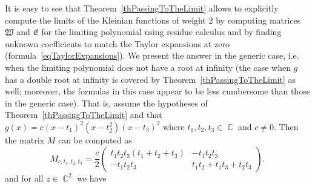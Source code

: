 \documentclass{amsart}
\numberwithin{equation}{section}
\theoremstyle{definition}
\theoremstyle{remark}
\DeclareMathOperator{\CC}{\mathbb C}
\begin{document}
	It is easy to see that Theorem~\ref{thPassingToTheLimit} allows to explicitly compute the limits of the Kleinian functions of weight $2$ by computing matrices $\mathfrak W$ and $\mathfrak E$ for the limiting polynomial using residue calculus and by finding unknown coefficients to match the Taylor expansions at zero (formula~\eqref{eqTaylorExpansions}). We present the answer in the generic case, i.e. when the limiting polynomial does not have a root at infinity (the case when $g$ has a double root at infinity is covered by Theorem~\ref{thPassingToTheLimit} as well; moreover, the formulas in this case appear to be less cumbersome than those in the generic case). That is, assume the hypotheses of Theorem~\ref{thPassingToTheLimit} and that $g(x) = c(x - t_1)^2(x - t_2^2)(x - t_3)^2$ where $t_1,t_2,t_3 \in \CC$ and $c \ne 0$. Then the matrix $M$ can be computed as
	\begin{equation*}
		M_{c,t_1,t_2,t_3} = \frac{c}{2}\begin{pmatrix}
			t_1 t_2 t_3 (t_1 + t_2 + t_3) & -t_1 t_2 t_3 \\
			-t_1 t_2 t_3 & t_1 t_2 + t_1 t_3 + t_2 t_3
		\end{pmatrix}.
	\end{equation*}
	and for all $z \in \CC^2$ we have
\end{document}
